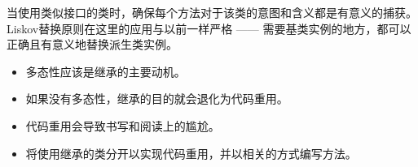 当使用类似接口的类时，确保每个方法对于该类的意图和含义都是有意义的捕获。Liskov替换原则在这里的应用与以前一样严格 —— 需要基类实例的地方，都可以正确且有意义地替换派生类实例。


\begin{itemize}
\item
多态性应该是继承的主要动机。

\item
如果没有多态性，继承的目的就会退化为代码重用。

\item
代码重用会导致书写和阅读上的尴尬。

\item
将使用继承的类分开以实现代码重用，并以相关的方式编写方法。
\end{itemize}






